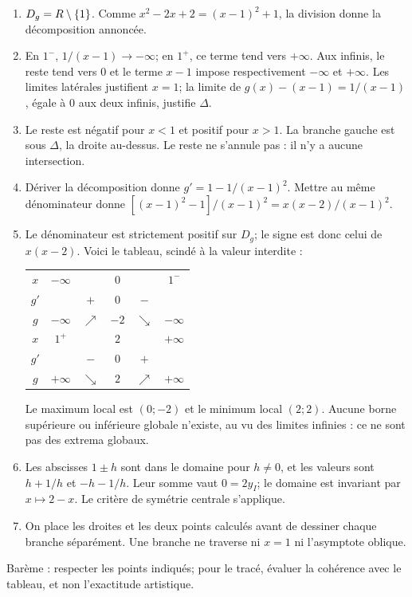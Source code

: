 \begin{corrige}\label{sol-t11s-ds1-e02}
\begin{enumerate}
\item $D_g=R\setminus\{1\}$. Comme $x^2-2x+2=(x-1)^2+1$, la division donne la décomposition annoncée.
\item En $1^-$, $1/(x-1)\to-\infty$; en $1^+$, ce terme tend vers $+\infty$. Aux infinis, le reste tend vers $0$ et le terme $x-1$ impose respectivement $-\infty$ et $+\infty$. Les limites latérales justifient $x=1$; la limite de $g(x)-(x-1)=1/(x-1)$, égale à $0$ aux deux infinis, justifie $\Delta$.
\item Le reste est négatif pour $x<1$ et positif pour $x>1$. La branche gauche est sous $\Delta$, la droite au-dessus. Le reste ne s’annule pas : il n’y a aucune intersection.
\item Dériver la décomposition donne $g'=1-1/(x-1)^2$. Mettre au même dénominateur donne $[(x-1)^2-1]/(x-1)^2=x(x-2)/(x-1)^2$.
\item Le dénominateur est strictement positif sur $D_g$; le signe est donc celui de $x(x-2)$. Voici le tableau, scindé à la valeur interdite :
\begin{center}\begin{tabular}{c|ccccc}
$x$&$-\infty$&&$0$&&$1^-$\\
$g'$&&$+$&$0$&$-$&\\
$g$&$-\infty$&$\nearrow$&$-2$&$\searrow$&$-\infty$\\\hline
$x$&$1^+$&&$2$&&$+\infty$\\
$g'$&&$-$&$0$&$+$&\\
$g$&$+\infty$&$\searrow$&$2$&$\nearrow$&$+\infty$
\end{tabular}\end{center}
Le maximum local est $(0;-2)$ et le minimum local $(2;2)$. Aucune borne supérieure ou inférieure globale n’existe, au vu des limites infinies : ce ne sont pas des extrema globaux.
\item Les abscisses $1\pm h$ sont dans le domaine pour $h\ne0$, et les valeurs sont $h+1/h$ et $-h-1/h$. Leur somme vaut $0=2y_I$; le domaine est invariant par $x\mapsto2-x$. Le critère de symétrie centrale s’applique.
\item On place les droites et les deux points calculés avant de dessiner chaque branche séparément. Une branche ne traverse ni $x=1$ ni l’asymptote oblique.
\end{enumerate}
Barème : respecter les points indiqués; pour le tracé, évaluer la cohérence avec le tableau, et non l’exactitude artistique.
\end{corrige}

